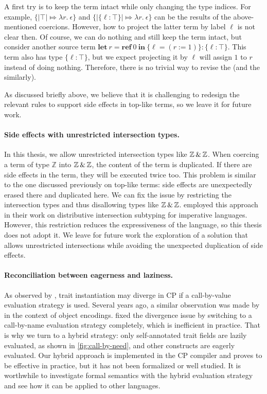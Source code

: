 A first try is to keep the term intact while only changing the type indices. For
example, $\{|\top| \Mapsto \lambda r.\ \epsilon\}$ and $\{|\{\ell:\top\}|
\Mapsto \lambda r.\ \epsilon\}$ can be the results of the above-mentioned
coercions. However, how to project the latter term by label $\ell$ is not clear
then. Of course, we can do nothing and still keep the term intact, but consider
another source term $\mathbf{let}\ r = \mathbf{ref}\ 0\ \mathbf{in}\ \{\ell = (r
:= 1)\} : \{\ell:\top\}$. This term also has type $\{\ell:\top\}$, but we expect
projecting it by $\ell$ will assign $1$ to $r$ instead of doing nothing.
Therefore, there is no trivial way to revise the  (and the
 similarly).

As discussed briefly above, we believe that it is challenging to redesign the
relevant rules to support side effects in top-like terms, so we leave it for
future work.

\paragraph{Side effects with unrestricted intersection types.}
In this thesis, we allow unrestricted intersection types like
$\mathbb{Z}\,\&\,\mathbb{Z}$. When coercing a term of type $\mathbb{Z}$ into
$\mathbb{Z}\,\&\,\mathbb{Z}$, the content of the term is duplicated. If there are
side effects in the term, they will be executed twice too. This problem is
similar to the one discussed previously on top-like terms: side effects are
unexpectedly erased there and duplicated here. We can fix the issue by
restricting the intersection types and thus disallowing types like
$\mathbb{Z}\,\&\,\mathbb{Z}$. \citet{ye2024imperative} employed this approach in
their work on distributive intersection subtyping for imperative languages.
However, this restriction reduces the expressiveness of the language, so this
thesis does not adopt it. We leave for future work the exploration of a solution
that allows unrestricted intersections while avoiding the unexpected duplication
of side effects.

\paragraph{Reconciliation between eagerness and laziness.}
As observed by \citet{fan2022direct}, trait instantiation may diverge in CP if a
call-by-value evaluation strategy is used. Several years ago, a
similar observation was made by \citet{bruce1999comparing} in the context of
object encodings. \citeauthor{fan2022direct} fixed the divergence issue by
switching to a call-by-name evaluation strategy completely, which is inefficient
in practice. That is why we turn to a hybrid strategy: only self-annotated trait
fields are lazily evaluated, as shown in \autoref{fig:call-by-need}, and other
constructs are eagerly evaluated. Our hybrid approach is implemented in the CP
compiler and proves to be effective in practice, but it has not been formalized
or well studied. It is worthwhile to investigate formal semantics with the
hybrid evaluation strategy and see how it can be applied to other languages.

